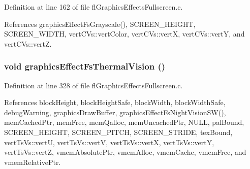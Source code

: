 Definition at line 162 of file fl\-Graphics\-Effects\-Fullscreen.c.

References graphics\-Effect\-Fs\-Grayscale(), SCREEN\_\-HEIGHT, SCREEN\_\-WIDTH, vert\-CVs::vert\-Color, vert\-CVs::vert\-X, vert\-CVs::vert\-Y, and vert\-CVs::vert\-Z.
\subsubsection{\setlength{\rightskip}{0pt plus 5cm}void graphics\-Effect\-Fs\-Thermal\-Vision ()}\label{flGraphicsEffectsFullscreen_8h_1a90fa1f7c7ce5255ec19fd152b41fc4}




Definition at line 328 of file fl\-Graphics\-Effects\-Fullscreen.c.

References block\-Height, block\-Height\-Safe, block\-Width, block\-Width\-Safe, debug\-Warning, graphics\-Draw\-Buffer, graphics\-Effect\-Fs\-Night\-Vision\-SW(), mem\-Cached\-Ptr, mem\-Free, mem\-Qalloc, mem\-Uncached\-Ptr, NULL, pal\-Bound, SCREEN\_\-HEIGHT, SCREEN\_\-PITCH, SCREEN\_\-STRIDE, tex\-Bound, vert\-Ts\-Vs::vert\-U, vert\-Ts\-Vs::vert\-V, vert\-Ts\-Vs::vert\-X, vert\-Ts\-Vs::vert\-Y, vert\-Ts\-Vs::vert\-Z, vmem\-Absolute\-Ptr, vmem\-Alloc, vmem\-Cache, vmem\-Free, and vmem\-Relative\-Ptr.